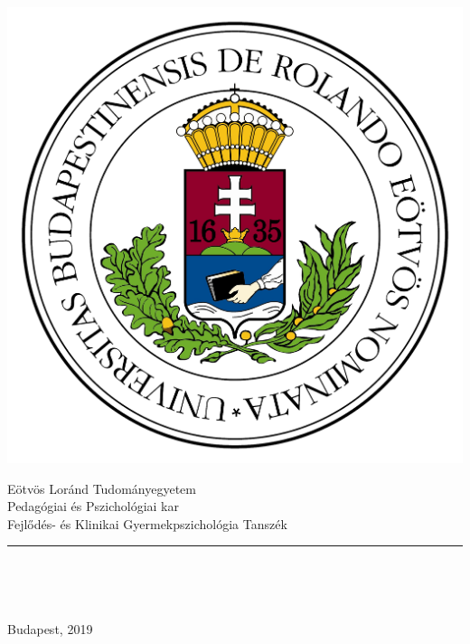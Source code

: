 \begin{titlepage}

\begin{minipage}{0.40\linewidth}
\includegraphics[scale=0.3]{images/elte_logo}
\end{minipage}
\begin{minipage}{0.50\linewidth}
\begin{center}
Eötvös Loránd Tudományegyetem \\
Pedagógiai és Pszichológiai kar \\
Fejlődés- és Klinikai Gyermekpszichológia Tanszék
\end{center}
\end{minipage}

\hrule
 \vfill

\begin{center}
\Huge
\textbf{\Title}
\normalsize
\end{center}

\begin{center}
	\Large
	\textbf{\SubTitle}
	\normalsize
\end{center}

\vfill

\begin{minipage}[t]{0.45\linewidth}
\begin{flushleft}
\textbf{\SupervisorName} \\
\SupervisorTitle
\end{flushleft}
\end{minipage}
\begin{minipage}[t]{0.5\linewidth}
\begin{flushright}
\textbf{\Author} \\
\AuthortTitle
\end{flushright}
\end{minipage}

\vfill

\begin{center}
Budapest, 2019
\end{center}

\end{titlepage}
